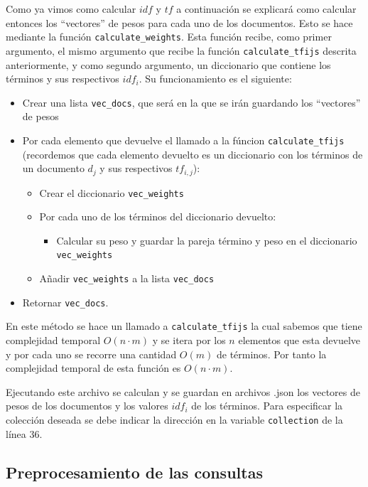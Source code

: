 \documentclass[runningheads]{llncs}
\begin{document}
	Como ya vimos como calcular $idf$ y $tf$ a continuaci\'on se explicar\'a como calcular entonces los ``vectores'' de pesos para cada uno de los documentos.  Esto se hace mediante la funci\'on \verb|calculate_weights|. Esta funci\'on recibe, como primer argumento, el mismo argumento que recibe la funci\'on \verb|calculate_tfijs| descrita anteriormente, y como segundo argumento, un diccionario que contiene los t\'erminos y sus respectivos $idf_i$. Su funcionamiento es el siguiente:
	
	\begin{itemize}
		\item Crear una lista \verb|vec_docs|, que ser\'a en la que se ir\'an guardando los ``vectores'' de pesos
		\item Por cada elemento que devuelve el llamado a la f\'uncion \verb|calculate_tfijs| (recordemos que cada elemento devuelto es un diccionario con los t\'erminos de un documento $d_j$ y sus respectivos $tf_{i,j}$):
		\begin{itemize}
			\item Crear el diccionario \verb|vec_weights|
			\item Por cada uno de los t\'erminos del diccionario devuelto:
			\begin{itemize}
				\item Calcular su peso y guardar la pareja t\'ermino y peso en el diccionario \verb|vec_weights|
			\end{itemize}
			\item A\~{n}adir \verb|vec_weights| a la lista \verb|vec_docs|
		\end{itemize}
		\item Retornar \verb|vec_docs|.
	\end{itemize}
	
	En este m\'etodo se hace un llamado a \verb|calculate_tfijs| la cual sabemos que tiene complejidad temporal $O(n\cdot m)$ y se itera por los $n$ elementos que esta devuelve y por cada uno se recorre una cantidad $O(m)$ de t\'erminos. Por tanto la complejidad temporal de esta funci\'on es $O(n\cdot m)$.
	
	Ejecutando este archivo se calculan y se guardan en archivos .json los vectores de pesos de los documentos y los valores $idf_i$ de los t\'erminos. Para especificar la colecci\'on deseada se debe indicar la direcci\'on en la variable \verb|collection| de la l\'inea 36.
	
	\subsection{Preprocesamiento de las consultas}
	
\end{document}
